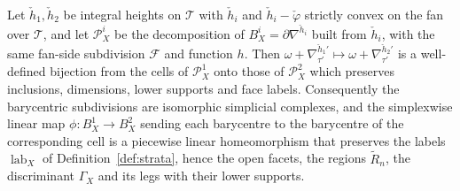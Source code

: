 \begin{lemma}\label{lem:indepheight}
Let $\check h_1,\check h_2$ be integral heights on $\mathcal T$ with $\check h_i$ and $\check h_i-\check\varphi$ strictly
convex on the fan over $\mathcal T$, and let $\mathscr P^i_X$ be the decomposition of $B^i_X=\partial\nabla^{\check h_i}$
built from $\check h_i$, with the same fan-side subdivision $\mathcal F$ and function $h$. Then
$\omega+\nabla^{\check h_1'}_{\tau'}\mapsto\omega+\nabla^{\check h_2'}_{\tau'}$ is a well-defined bijection from the cells of
$\mathscr P^1_X$ onto those of $\mathscr P^2_X$ which preserves inclusions, dimensions, lower supports and face labels.
Consequently the barycentric subdivisions are isomorphic simplicial complexes, and the simplexwise linear map
$\phi\colon B^1_X\to B^2_X$ sending each barycentre to the barycentre of the corresponding cell is a piecewise linear
homeomorphism that preserves the labels $\operatorname{lab}_X$ of Definition~\ref{def:strata}, hence the open facets, the regions
$\widetilde R_n$, the discriminant $\Gamma_X$ and its legs with their lower supports.
\end{lemma}
